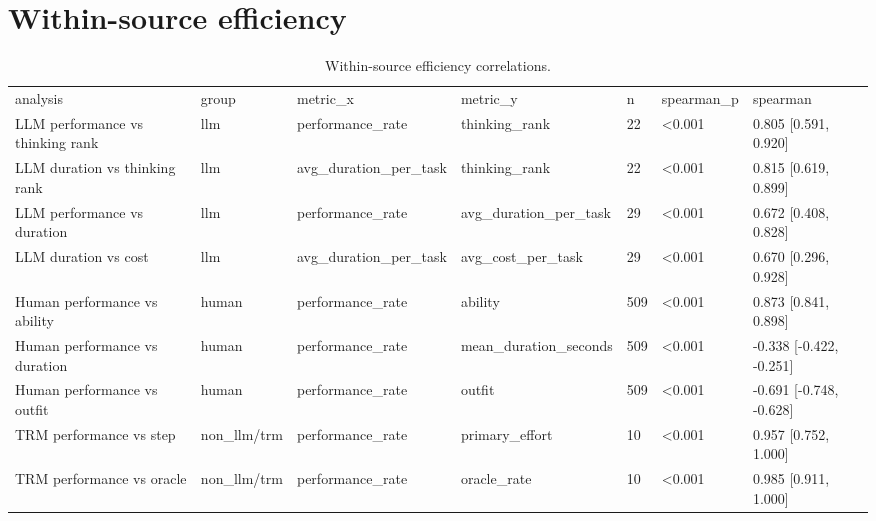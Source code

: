 \documentclass[11pt]{article}
\begin{document}
\section{Within-source efficiency}
\begin{table}[htbp]
\centering
\caption{Within-source efficiency correlations.}
\label{tab:source_corr}
\begin{tabular}{lllllll}
\toprule
analysis & group & metric\_x & metric\_y & n & spearman\_p & spearman \\
LLM performance vs thinking rank & llm & performance\_rate & thinking\_rank & 22 & <0.001 & 0.805 [0.591, 0.920] \\
LLM duration vs thinking rank & llm & avg\_duration\_per\_task & thinking\_rank & 22 & <0.001 & 0.815 [0.619, 0.899] \\
LLM performance vs duration & llm & performance\_rate & avg\_duration\_per\_task & 29 & <0.001 & 0.672 [0.408, 0.828] \\
LLM duration vs cost & llm & avg\_duration\_per\_task & avg\_cost\_per\_task & 29 & <0.001 & 0.670 [0.296, 0.928] \\
Human performance vs ability & human & performance\_rate & ability & 509 & <0.001 & 0.873 [0.841, 0.898] \\
Human performance vs duration & human & performance\_rate & mean\_duration\_seconds & 509 & <0.001 & -0.338 [-0.422, -0.251] \\
Human performance vs outfit & human & performance\_rate & outfit & 509 & <0.001 & -0.691 [-0.748, -0.628] \\
TRM performance vs step & non\_llm/trm & performance\_rate & primary\_effort & 10 & <0.001 & 0.957 [0.752, 1.000] \\
TRM performance vs oracle & non\_llm/trm & performance\_rate & oracle\_rate & 10 & <0.001 & 0.985 [0.911, 1.000] \\
\bottomrule
\end{tabular}
\end{table}
\end{document}
